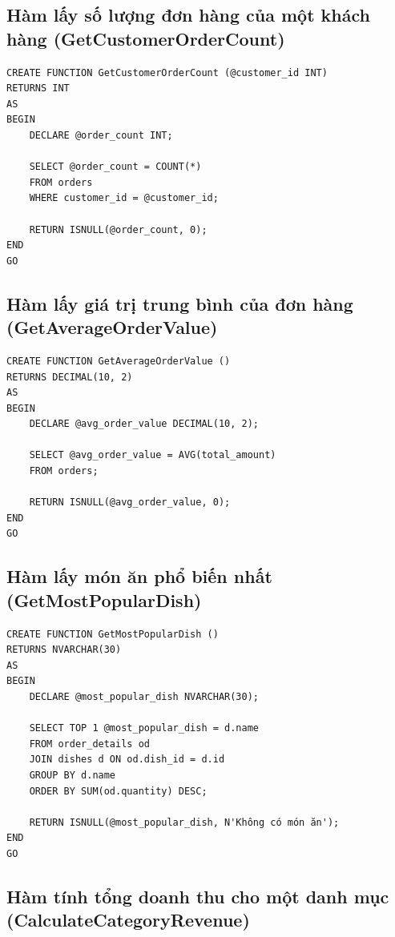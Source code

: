 \documentclass{article}
\begin{document}
\subsection{Hàm lấy số lượng đơn hàng của một khách hàng (GetCustomerOrderCount)}

\begin{verbatim}
CREATE FUNCTION GetCustomerOrderCount (@customer_id INT)
RETURNS INT
AS
BEGIN
    DECLARE @order_count INT;

    SELECT @order_count = COUNT(*)
    FROM orders
    WHERE customer_id = @customer_id;

    RETURN ISNULL(@order_count, 0);
END
GO
\end{verbatim}

\subsection{Hàm lấy giá trị trung bình của đơn hàng (GetAverageOrderValue)}

\begin{verbatim}
CREATE FUNCTION GetAverageOrderValue ()
RETURNS DECIMAL(10, 2)
AS
BEGIN
    DECLARE @avg_order_value DECIMAL(10, 2);

    SELECT @avg_order_value = AVG(total_amount)
    FROM orders;

    RETURN ISNULL(@avg_order_value, 0);
END
GO
\end{verbatim}

\subsection{Hàm lấy món ăn phổ biến nhất (GetMostPopularDish)}

\begin{verbatim}
CREATE FUNCTION GetMostPopularDish ()
RETURNS NVARCHAR(30)
AS
BEGIN
    DECLARE @most_popular_dish NVARCHAR(30);

    SELECT TOP 1 @most_popular_dish = d.name
    FROM order_details od
    JOIN dishes d ON od.dish_id = d.id
    GROUP BY d.name
    ORDER BY SUM(od.quantity) DESC;

    RETURN ISNULL(@most_popular_dish, N'Không có món ăn');
END
GO
\end{verbatim}

\subsection{Hàm tính tổng doanh thu cho một danh mục (CalculateCategoryRevenue)}
\end{document}
